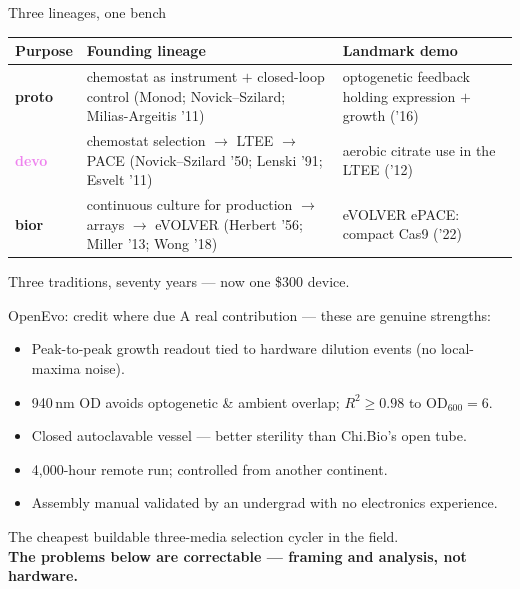 \documentclass[aspectratio=169,11pt]{beamer}
\newcommand{\gd}[1]{\textcolor{good}{#1}}
\begin{document}
\begin{frame}{Three lineages, one bench}
  \small
  \begin{center}
  \begin{tabular}{@{}p{1.5cm} p{5.2cm} p{4.9cm}@{}}
    \toprule
    \textbf{Purpose} & \textbf{Founding lineage} & \textbf{Landmark demo} \\
    \midrule
    \textcolor{accent}{\textbf{proto}} & chemostat as instrument $+$ closed-loop control (Monod; Novick--Szilard; Milias-Argeitis '11) & optogenetic feedback holding expression $+$ growth ('16) \\
    \textcolor{violet}{\textbf{devo}} & chemostat selection $\to$ LTEE $\to$ PACE (Novick--Szilard '50; Lenski '91; Esvelt '11) & aerobic citrate use in the LTEE ('12) \\
    \textcolor{warn}{\textbf{bior}} & continuous culture for production $\to$ arrays $\to$ eVOLVER (Herbert '56; Miller '13; Wong '18) & eVOLVER ePACE: compact Cas9 ('22) \\
    \bottomrule
  \end{tabular}
  \end{center}
  \vspace{0.3em}
  \begin{center}\small Three traditions, seventy years --- now one \$300 device.\end{center}
\end{frame}

\begin{frame}{OpenEvo: credit where due}
  A real contribution --- these are genuine strengths:
  \begin{itemize}
    \item \gd{Peak-to-peak growth readout} tied to hardware dilution events (no local-maxima noise).
    \item \gd{940\,nm OD} avoids optogenetic \& ambient overlap; $R^2\!\ge\!0.98$ to $\mathrm{OD}_{600}=6$.
    \item \gd{Closed autoclavable vessel} --- better sterility than Chi.Bio's open tube.
    \item \gd{4{,}000-hour remote run}; controlled from another continent.
    \item \gd{Assembly manual} validated by an undergrad with no electronics experience.
  \end{itemize}
  \vspace{0.3em}
  The cheapest buildable three-media selection cycler in the field. \\
  \textbf{The problems below are correctable --- framing and analysis, not hardware.}
\end{frame}
\end{document}
